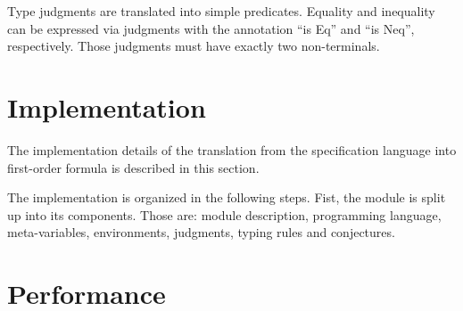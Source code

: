 Type judgments are translated into simple predicates. Equality and
inequality can be expressed via judgments with the annotation ``is
Eq'' and ``is Neq'', respectively. Those judgments must have exactly
two non-terminals.
\section{Implementation}
The implementation details of the translation from the specification
language into first-order formula is described in this section.

The implementation is organized in the following steps. Fist, the
module is split up into its components. Those are: module description,
programming language, meta-variables, environments, judgments, typing
rules and conjectures. 

\section{Performance}
